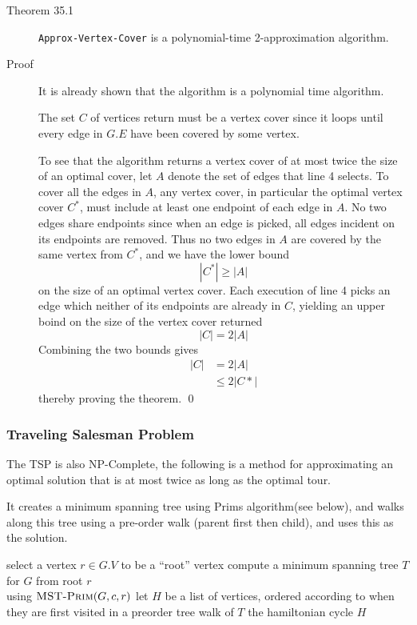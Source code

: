
\begin{description}
\item[Theorem 35.1] \texttt{Approx-Vertex-Cover} is a polynomial-time
  2-approximation algorithm.
\item[Proof] It is already shown that the algorithm is a polynomial time
  algorithm.

  The set $C$ of vertices return must be a vertex cover since it loops until
  every edge in $G.E$ have been covered by some vertex.

  To see that the algorithm returns a vertex cover of at most twice the size of
  an optimal cover, let $A$ denote the set of edges that line 4 selects.  To
  cover all the edges in $A$, any vertex cover, in particular the optimal vertex
  cover $C^*$, must include at least one endpoint of each edge in $A$. No two
  edges share endpoints since when an edge is picked, all edges incident on its
  endpoints are removed. Thus no two edges in $A$ are covered by the same vertex
  from $C^*$, and we have the lower bound
  \[
    |C^*| \geq |A|
  \]
  on the size of an optimal vertex cover. Each execution of line 4 picks an edge
  which neither of its endpoints are already in $C$, yielding an upper boind on
  the size of the vertex cover returned
  \[
    |C| = 2|A|
  \]
  Combining the two bounds gives
  \begin{align*}
    |C| &= 2|A| \\
        &\leq 2|C*|
  \end{align*}
  thereby proving the theorem. \qed
\end{description}


\subsubsection{Traveling Salesman Problem}
The TSP is also NP-Complete, the following is a method for approximating an
optimal solution that is at most twice as long as the optimal tour.

It creates a minimum spanning tree using Prims algorithm(see below), and walks along this
tree using a pre-order walk (parent first then child), and uses this as the
solution.

\begin{codebox}
\li select a vertex $r \in G.V$ to be a ``root'' vertex
\li compute a minimum spanning tree $T$ for $G$ from root $r$ \\
    using $\textnormal{\scshape MST-Prim}(G,c,r)$
\li let $H$ be a list of vertices, ordered according to when\\
    they are first visited in a preorder tree walk of $T$
\li \Return the hamiltonian cycle $H$
\end{codebox}

